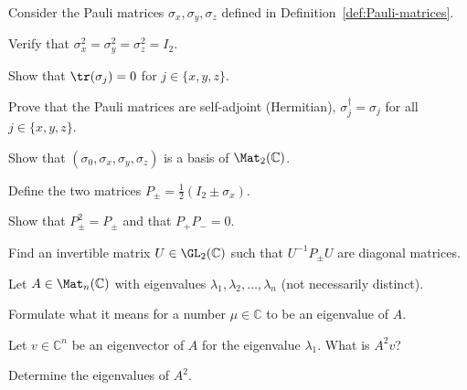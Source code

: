 \documentclass[a4paper,oneside, 12pt]{amsart}
\begin{document}
\begin{exercise}\label{ex:props-of-Pauli-matrices}
  Consider the Pauli matrices \(\sigma_x, \sigma_y, \sigma_z\) defined in Definition~\ref{def:Pauli-matrices}.
  \begin{thmlist}
    \item Verify that \(\sigma_x^2 = \sigma_y^2 = \sigma_z^2 = I_2\).
    \item Show that \(\tr(\sigma_j) = 0\) for \(j \in \{x, y, z\}\).
    \item Prove that the Pauli matrices are self-adjoint (Hermitian), \ie \(\sigma_j^\dagger = \sigma_j\) for all \(j \in\{x,y,z\}\).
    \item Show that \((\sigma_{0}, \sigma_{x}, \sigma_{y}, \sigma_{z})\) is a basis of \(\Mat_{2}( \mathbb{C})\).
  \end{thmlist}
  Define the two matrices \(P_{\pm} = \frac{1}{2}(I_2 \pm \sigma_x)\).
  \begin{thmlist}[resume]
    \item Show that \(P_{\pm}^{2} = P_{\pm}\) and that \(P_+ P_- = 0\).
    \item Find an invertible matrix \(U\in \GL_{2}( \mathbb{C})\) such that \(U^{-1}P_{\pm}U\) are diagonal matrices.
  \end{thmlist}
\end{exercise}

\begin{exercise}
  Let \(A \in \Mat_n(\mathbb{C})\) with eigenvalues \(\lambda_{1}, \lambda_{2}, \dots , \lambda_{n}\) (not necessarily distinct).
  \begin{thmlist}
    \item Formulate what it means for a number \(\mu \in \mathbb{C}\) to be an eigenvalue of \(A\).
    \item Let \(v \in \mathbb{C}^{n}\) be an eigenvector of \(A\) for the eigenvalue \(\lambda_{1}\).
    What is \(A^{2}v\)?
    \item Determine the eigenvalues of \(A^{2}\).
  \end{thmlist}
\end{exercise}
\end{document}
